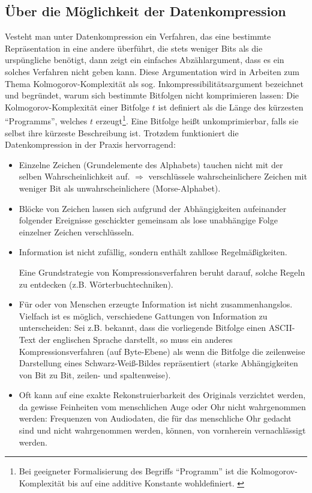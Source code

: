 \documentclass[a4paper,12pt]{article}
\begin{document}
\subsection{Über die Möglichkeit der Datenkompression}
 Vesteht man unter Datenkompression ein Verfahren, das eine bestimmte Repräsentation in eine andere überführt, die stets weniger Bits als die urspüngliche benötigt, dann zeigt ein einfaches Abzählargument, dass es ein solches Verfahren nicht geben kann. Diese Argumentation wird in Arbeiten zum Thema Kolmogorov-Komplexität als sog. Inkompressibilitätsargument bezeichnet und begründet, warum sich bestimmte Bitfolgen nicht komprimieren lassen: Die Kolmogorov-Komplexität einer Bitfolge $t$ ist definiert als die Länge des kürzesten "`Programms"', welches $t$ erzeugt\footnote{\footnotesize{Bei geeigneter Formalisierung des Begriffs
"`Programm"' ist die Kolmogorov-Komplexität bis auf eine additive Konstante wohldefiniert.\cite{Li} }}. Eine Bitfolge heißt unkomprimierbar, falls sie selbst ihre kürzeste Beschreibung ist.
Trotzdem funktioniert die Datenkompression in der Praxis hervorragend:
\begin{itemize}
	\item Einzelne Zeichen (Grundelemente des Alphabets) tauchen nicht mit der selben Wahrscheinlichkeit auf. $\Rightarrow$ 
verschlüssele wahrscheinlichere Zeichen mit weniger Bit als unwahrscheinlichere (Morse-Alphabet).
\item Blöcke von Zeichen lassen sich aufgrund der Abhängigkeiten aufeinander folgender Ereignisse geschickter gemeinsam als lose unabhängige Folge einzelner Zeichen verschlüsseln.  
\item Information ist nicht zufällig, sondern enthält  zahllose Regelmäßigkeiten.
\par
 Eine Grundstrategie von Kompressionsverfahren beruht darauf, solche Regeln zu entdecken (z.B. Wörterbuchtechniken).
\item  Für oder von Menschen erzeugte Information ist nicht zusammenhangslos. Vielfach ist es möglich, verschiedene Gattungen von Information zu unterscheiden: Sei z.B. bekannt, dass die vorliegende Bitfolge einen ASCII-Text der englischen Sprache darstellt, so muss ein anderes Kompressionsverfahren (auf Byte-Ebene) als wenn die Bitfolge die zeilenweise Darstellung eines Schwarz-Weiß-Bildes repräsentiert (starke Abhängigkeiten von Bit zu Bit, zeilen- und spaltenweise).
\item Oft kann auf eine exakte Rekonstruierbarkeit des Originals verzichtet werden, da gewisse Feinheiten vom menschlichen Auge oder Ohr nicht wahrgenommen werden:  Frequenzen von Audiodaten, die für das menschliche Ohr gedacht sind und nicht wahrgenommen werden, können, von vornherein vernachlässigt werden.
\end{itemize}
\end{document}
